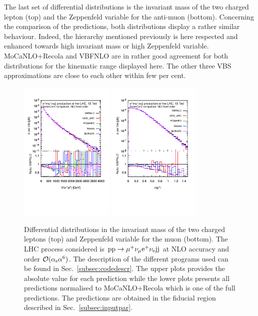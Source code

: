 The last set of differential distributions is the invariant mass of the two charged lepton (top) and the Zeppenfeld variable for the anti-muon (bottom).
Concerning the comparison of the predictions, both distributions display a rather similar behaviour.
Indeed, the hierarchy mentioned previously is here respected and enhanced towards high invariant mass or high Zeppenfeld variable.
{\sc MoCaNLO}+{\sc Recola} and {\sc VBFNLO} are in rather good agreement for both distributions for the kinematic range displayed here.
The other three VBS approximations are close to each other within few per cent.

 \begin{figure}[hbt!]
   \centering
   \includegraphics[width=0.4\textwidth,angle=0,clip=true,trim={0.4cm 2cm 0.cm 1.cm}]{figures/NLO/mll_NLO.pdf}
   \includegraphics[width=0.4\textwidth,angle=0,clip=true,trim={0.4cm 2cm 0.cm 1.cm}]{figures/NLO/zmu_NLO.pdf}
\caption{\label{fig:distNLO3} Differential distributions in the invariant mass of the two charged leptons (top) and Zeppenfeld variable for the muon (bottom).
The LHC process considered is ${\rm p}{\rm p}\to\mu^+\nu_\mu{\rm e}^+\nu_{\rm e}{\rm j}{\rm j}$ at NLO accuracy and order $\mathcal{O}(\alpha_{\rm s}\alpha^6)$.
The description of the different programs used can be found in Sec.~\ref{subsec:codedescr}.
The upper plots provides the absolute value for each prediction while the lower plots presents all predictions normalised to {\sc MoCaNLO}+{\sc Recola} which is one of the full predictions.
The predictions are obtained in the fiducial region described in Sec.~\ref{subsec:inputpar}.
}
\end{figure}
